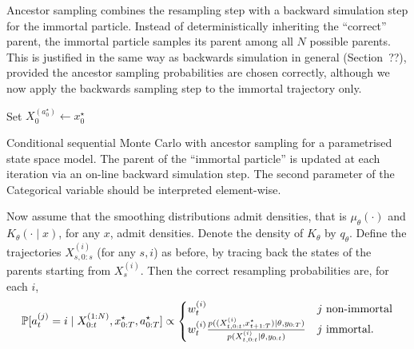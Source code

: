 Ancestor sampling combines the resampling step with a backward simulation step for the immortal particle. Instead of deterministically inheriting the ``correct'' parent, the immortal particle samples its parent among all $N$ possible parents.
This is justified in the same way as backwards simulation in general (Section~??), provided the ancestor sampling probabilities are chosen correctly, although we now apply the backwards sampling step to the immortal trajectory only.

\begin{algorithm}[ht]
\vspace*{10pt}
\DontPrintSemicolon
{}
Set $X_0^{(a_0^\star)} \gets x_0^\star$\;
\vspace*{10pt}
\caption[Conditional sequential Monte Carlo with ancestor sampling]{Conditional sequential Monte Carlo with ancestor sampling for a parametrised state space model. The parent of the ``immortal particle'' is updated at each iteration via an on-line backward simulation step. The second parameter of the Categorical variable should be interpreted element-wise.}
\label{alg:condSMC_ancsamp}
\end{algorithm}
Now assume that the smoothing distributions admit densities, that is $\mu_\theta(\cdot)$ and $K_\theta(\cdot\mid x)$, for any $x$, admit densities. Denote the density of $K_\theta$ by $q_\theta$. Define the trajectories $X_{s, 0:s}^{(i)}$ (for any $s,i$) as before, by tracing back the states of the parents starting from $X_s^{(i)}$.
Then the correct resampling probabilities are, for each $i$,
\begin{equation}\label{eq:ancsamp_probs}
\mathbb{P}[a_t^{(j)} = i \mid X_{0:t}^{(1:N)}, x_{0:T}^\star, a_{0:T}^\star ] 
\propto \begin{cases}
w_t^{(i)} & j \text{ non-immortal}\\
w_t^{(i)} \frac{
        p( (X_{t,0:t}^{(i)}, x_{t+1:T}^\star) \mid \theta, y_{0:T} )}
        {p( X_{t,0:t}^{(i)} \mid \theta, y_{0:t} ) } 
        & j \text{ immortal} .
\end{cases}
\end{equation}

